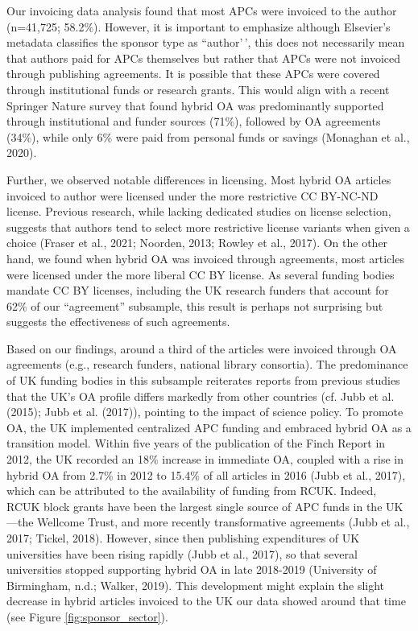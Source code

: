 \documentclass[a4paper,man,floatsintext,longtable,noextraspace,12pt]{apa6}
\begin{document}
Our invoicing data analysis found that most APCs were invoiced to the
author (n=41,725; 58.2\%). However, it is important to emphasize
although Elsevier's metadata classifies the sponsor type as
``author'\,', this does not necessarily mean that authors paid for APCs
themselves but rather that APCs were not invoiced through publishing
agreements. It is possible that these APCs were covered through
institutional funds or research grants. This would align with a recent
Springer Nature survey that found hybrid OA was predominantly supported
through institutional and funder sources (71\%), followed by OA
agreements (34\%), while only 6\% were paid from personal funds or
savings (Monaghan et al., 2020).

Further, we observed notable differences in licensing. Most hybrid OA
articles invoiced to author were licensed under the more restrictive CC
BY-NC-ND license. Previous research, while lacking dedicated studies on
license selection, suggests that authors tend to select more restrictive
license variants when given a choice (Fraser et al., 2021; Noorden,
2013; Rowley et al., 2017). On the other hand, we found when hybrid OA
was invoiced through agreements, most articles were licensed under the
more liberal CC BY license. As several funding bodies mandate CC BY
licenses, including the UK research funders that account for 62\% of our
``agreement'' subsample, this result is perhaps not surprising but
suggests the effectiveness of such agreements.

Based on our findings, around a third of the articles were invoiced
through OA agreements (e.g., research funders, national library
consortia). The predominance of UK funding bodies in this subsample
reiterates reports from previous studies that the UK's OA profile
differs markedly from other countries (cf. Jubb et al. (2015); Jubb et
al. (2017)), pointing to the impact of science policy. To promote OA,
the UK implemented centralized APC funding and embraced hybrid OA as a
transition model. Within five years of the publication of the Finch
Report in 2012, the UK recorded an 18\% increase in immediate OA,
coupled with a rise in hybrid OA from 2.7\% in 2012 to 15.4\% of all
articles in 2016 (Jubb et al., 2017), which can be attributed to the
availability of funding from RCUK. Indeed, RCUK block grants have been
the largest single source of APC funds in the UK---the Wellcome Trust,
and more recently transformative agreements (Jubb et al., 2017; Tickel,
2018). However, since then publishing expenditures of UK universities
have been rising rapidly (Jubb et al., 2017), so that several
universities stopped supporting hybrid OA in late 2018-2019 (University
of Birmingham, n.d.; Walker, 2019). This development might explain the
slight decrease in hybrid articles invoiced to the UK our data showed
around that time (see Figure \ref{fig:sponsor_sector}).
\end{document}
